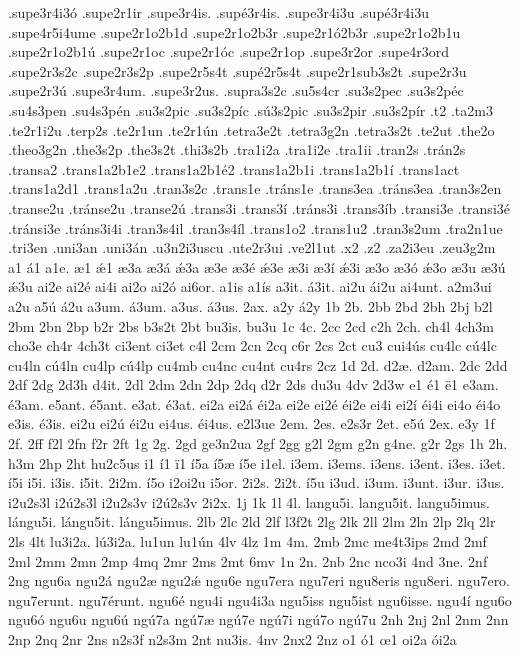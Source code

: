{.supe3r4i3ó
.supe2r1ir
.supe3r4is.
.supé3r4is.
.supe3r4i3u
.supé3r4i3u
.supe4r5i4ume
.supe2r1o2b1d
.supe2r1o2b3r
.supe2r1ó2b3r
.supe2r1o2b1u
.supe2r1o2b1ú
.supe2r1oc
.supe2r1óc
.supe2r1op
.supe3r2or
.supe4r3ord
.supe2r3s2c
.supe2r3s2p
.supe2r5s4t
.supé2r5s4t
.supe2r1sub3s2t
.supe2r3u
.supe2r3ú
.supe3r4um.
.supe3r2us.
.supra3s2c
.su5s4cr
.su3s2pec
.su3s2péc
.su4s3pen
.su4s3pén
.su3s2pic
.su3s2píc
.sú3s2pic
.su3s2pir
.su3s2pír
.t2
.ta2m3
.te2r1i2u
.terp2s
.te2r1un
.te2r1ún
.tetra3e2t
.tetra3g2n
.tetra3s2t
.te2ut
.the2o
.theo3g2n
.the3s2p
.the3s2t
.thi3s2b
.tra1i2a
.tra1i2e
.tra1ii
.tran2s
.trán2s
.transa2
.trans1a2b1e2
.trans1a2b1é2
.trans1a2b1i
.trans1a2b1í
.trans1act
.trans1a2d1
.trans1a2u
.tran3s2c
.trans1e
.tráns1e
.trans3ea
.tráns3ea
.tran3s2en
.transe2u
.tránse2u
.transe2ú
.trans3i
.trans3í
.tráns3i
.trans3íb
.transi3e
.transi3é
.tránsi3e
.tráns3i4i
.tran3s4il
.tran3s4íl
.trans1o2
.trans1u2
.tran3s2um
.tra2n1ue
.tri3en
.uni3an
.uni3án
.u3n2i3uscu
.ute2r3ui
.ve2l1ut
.x2
.z2
.za2i3eu
.zeu3g2m
a1
á1
a1e.
æ1
ǽ1
æ3a
æ3á
ǽ3a
æ3e
æ3é
ǽ3e
æ3i
æ3í
ǽ3i
æ3o
æ3ó
ǽ3o
æ3u
æ3ú
ǽ3u
ai2e
ai2é
ai4i
ai2o
ai2ó
ai6or.
a1is
a1ís
a3it.
á3it.
ai2u
ái2u
ai4unt.
a2m3ui
a2u
a5ú
á2u
a3um.
á3um.
a3us.
á3us.
2ax.
a2y
á2y
1b
2b.
2bb
2bd
2bh
2bj
b2l
2bm
2bn
2bp
b2r
2bs
b3s2t
2bt
bu3is.
bu3u
1c
4c.
2cc
2cd
c2h
2ch.
ch4l
4ch3m
cho3e
ch4r
4ch3t
ci3ent
ci3et
c4l
2cm
2cn
2cq
c6r
2cs
2ct
cu3
cui4ús
cu4lc
cú4lc
cu4ln
cú4ln
cu4lp
cú4lp
cu4mb
cu4nc
cu4nt
cu4rs
2cz
1d
2d.
d2æ.
d2am.
2dc
2dd
2df
2dg
2d3h
d4it.
2dl
2dm
2dn
2dp
2dq
d2r
2ds
du3u
4dv
2d3w
e1
é1
ë1
e3am.
é3am.
e5ant.
é5ant.
e3at.
é3at.
ei2a
ei2á
éi2a
ei2e
ei2é
éi2e
ei4i
ei2í
éi4i
ei4o
éi4o
e3is.
é3is.
ei2u
ei2ú
éi2u
ei4us.
éi4us.
e2l3ue
2em.
2es.
e2s3r
2et.
e5ú
2ex.
e3y
1f
2f.
2ff
f2l
2fn
f2r
2ft
1g
2g.
2gd
ge3n2ua
2gf
2gg
g2l
2gm
g2n
g4ne.
g2r
2gs
1h
2h.
h3m
2hp
2ht
hu2c5us
i1
í1
ï1
í5a
í5æ
í5e
i1el.
i3em.
i3ems.
i3ens.
i3ent.
i3es.
i3et.
í5i
i5i.
i3is.
i5it.
2i2m.
í5o
i2oi2u
i5or.
2i2s.
2i2t.
í5u
i3ud.
i3um.
i3unt.
i3ur.
i3us.
i2u2s3l
i2ú2s3l
i2u2s3v
i2ú2s3v
2i2x.
1j
1k
1l
4l.
langu5i.
langu5it.
langu5imus.
lángu5i.
lángu5it.
lángu5imus.
2lb
2lc
2ld
2lf
l3f2t
2lg
2lk
2ll
2lm
2ln
2lp
2lq
2lr
2ls
4lt
lu3i2a.
lú3i2a.
lu1un
lu1ún
4lv
4lz
1m
4m.
2mb
2mc
me4t3ips
2md
2mf
2ml
2mm
2mn
2mp
4mq
2mr
2ms
2mt
6mv
1n
2n.
2nb
2nc
nco3i
4nd
3ne.
2nf
2ng
ngu6a
ngu2á
ngu2æ
ngu2ǽ
ngu6e
ngu7era
ngu7eri
ngu8eris
ngu8eri.
ngu7ero.
ngu7erunt.
ngu7érunt.
ngu6é
ngu4i
ngu4i3a
ngu5iss
ngu5ist
ngu6isse.
ngu4í
ngu6o
ngu6ó
ngu6u
ngu6ú
ngú7a
ngú7æ
ngú7e
ngú7i
ngú7o
ngú7u
2nh
2nj
2nl
2nm
2nn
2np
2nq
2nr
2ns
n2s3f
n2s3m
2nt
nu3is.
4nv
2nx2
2nz
o1
ó1
œ1
oi2a
ói2a
}

